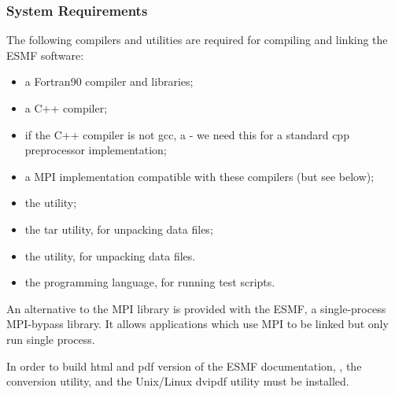 
\subsubsection{System Requirements}
\label{sec:systemreq}

The following compilers and utilities are required for compiling and 
linking the ESMF software:
\begin{itemize}
\item a Fortran90 compiler and libraries;
\item a C++ compiler;
\item if the C++ compiler is not gcc, a  - we need this for a 
standard cpp preprocessor implementation;
\item a MPI implementation compatible with these compilers (but see below);
\item the  utility; 
\item the tar utility, for unpacking data files;
\item the  utility, for unpacking data files.
\item the  programming language, for running test scripts.
\end{itemize} 

An alternative to the MPI library is provided with the ESMF,
a single-process MPI-bypass library.  It allows applications which
use MPI to be linked but only run single process.

In order to build html and pdf version of the ESMF documentation, 
, the  conversion utility, and the Unix/Linux dvipdf utility must be installed.







